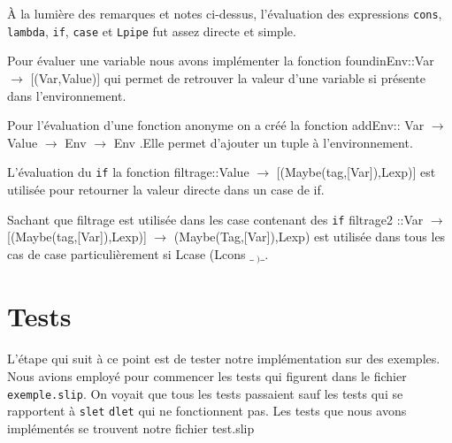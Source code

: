 \documentclass[10pt, titlepage]{article}
\begin{document}
À la lumière des remarques et notes ci-dessus, l'évaluation des expressions
\texttt{cons}, \texttt{lambda}, \texttt{if}, \texttt{case} et \texttt{Lpipe}
fut assez directe et simple. 

Pour évaluer une variable nous avons implémenter la fonction  foundinEnv::Var $\rightarrow$ [(Var,Value)] qui permet de retrouver la valeur d'une variable si présente dans l'environnement.

Pour l'évaluation d'une fonction anonyme on a créé la fonction  addEnv:: Var $\rightarrow$ Value $\rightarrow$ Env $\rightarrow$ Env .Elle permet d'ajouter un tuple à l'environnement.

L'évaluation du \texttt{if}  la fonction filtrage::Value $\rightarrow$ [(Maybe(tag,[Var]),Lexp)] est utilisée  pour retourner la valeur directe dans un case de if.

Sachant que filtrage est utilisée dans les case contenant des \texttt{if}   
filtrage2 ::Var $\rightarrow$ [(Maybe(tag,[Var]),Lexp)]  $\rightarrow$ (Maybe(Tag,[Var]),Lexp)  est utilisée dans tous les cas de case particulièrement si Lcase (Lcons $\_\ _ )\_$.\\

\section{Tests}

L'étape qui suit à ce point est de tester notre implémentation sur des
exemples. Nous avions employé pour commencer les tests qui figurent dans le
fichier \texttt{exemple.slip}. On voyait que tous les tests passaient sauf les tests qui se rapportent à \texttt{slet} \texttt{dlet} qui ne fonctionnent pas. Les tests que nous avons implémentés se trouvent notre fichier test.slip
\end{document}
